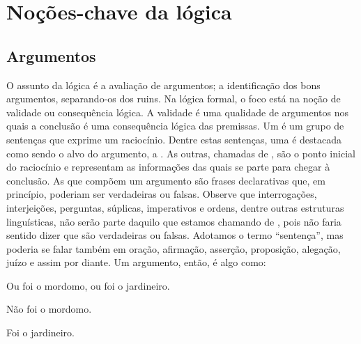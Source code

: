\part{Noções-chave da lógica}
\label{ch.intro}


\chapter{Argumentos}
\label{s:Arguments}




O assunto da lógica é a avaliação de argumentos; a identificação dos bons argumentos, separando-os dos ruins.
Na lógica formal, o foco está na noção de validade ou consequência lógica.
A validade é uma qualidade de argumentos nos quais a conclusão é uma consequência lógica das premissas.
Um  é um grupo de sentenças que exprime um raciocínio.
Dentre estas sentenças, uma é destacada como sendo o alvo do argumento, a .
As outras, chamadas de , são o ponto inicial do raciocínio e representam as informações das quais se parte para chegar à conclusão.
As  que compõem um argumento são frases declarativas que, em princípio, poderiam ser verdadeiras ou falsas.
Observe que interrogações, interjeições, perguntas, súplicas, imperativos e ordens, dentre outras estruturas linguísticas, não serão parte daquilo que estamos chamando de , pois não faria sentido dizer que são verdadeiras ou falsas.
Adotamos o termo ``sentença'', mas poderia se falar também em oração, afirmação, asserção, proposição, alegação, juízo e assim por diante.
Um argumento, então, é algo como:

	\begin{earg}\label{argButlerGardner}
		\item[] Ou foi o mordomo, ou foi o jardineiro.
		\item[] Não foi o mordomo.
		\item[\therefore] Foi o jardineiro.
	\end{earg}
	
